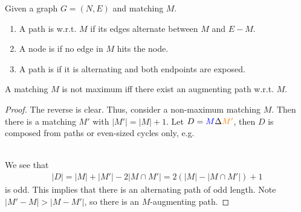 \begin{definition}
    Given a graph $G=(N,E)$ and matching $M$.
    \begin{enumerate}
        \item A path is  w.r.t. $M$
              if its edges alternate between $M$ and $E-M$.
        \item A node is  if no edge in $M$ hits the node.
        \item A path is  if it is alternating and both endpoints are exposed.
    \end{enumerate}
\end{definition}
\begin{theorem}
    A matching $M$ is not maximum iff there exist an augmenting path w.r.t. $M$.
\end{theorem}
\begin{proof}
    The reverse is clear. Thus, consider a non-maximum matching $M$. Then there
    is a matching $M'$ with $|M'|=|M|+1$. Let $D=\textcolor{blue}{M} \Delta \textcolor{orange}{M'}$, then
    $D$ is composed from paths or even-sized cycles only, e.g.
    \vspace{8pt}
    \\
    \begin{minipage}{\textwidth}
        \centering
    \end{minipage}
    \vspace{5pt}
    \\
    We see that
    \begin{align*}
        |D|=|M|+|M'|-2|M \cap M'| = 2 (|M| - |M \cap M'|) + 1
    \end{align*}
    is odd. This implies that there is an alternating path of odd length.
    Note $|M'-M|>|M-M'|$, so there is an $M$-augmenting path.
\end{proof}
